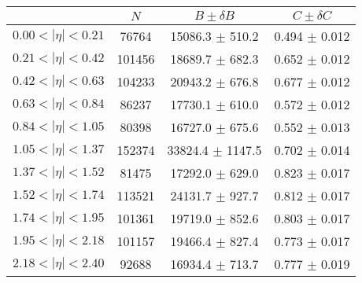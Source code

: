 \begin{tabular}{lccc}
\hline
    &   $N$   & $B \pm \delta B$  &  $C \pm \delta C$ \\
\hline
$0.00 < |\eta| <0.21$          & 76764      & 15086.3    $\pm$ 510.2 & 0.494      $\pm$ 0.012 \\
$0.21 < |\eta| <0.42$          & 101456     & 18689.7    $\pm$ 682.3 & 0.652      $\pm$ 0.012 \\
$0.42 < |\eta| <0.63$          & 104233     & 20943.2    $\pm$ 676.8 & 0.677      $\pm$ 0.012 \\
$0.63 < |\eta| <0.84$          & 86237      & 17730.1    $\pm$ 610.0 & 0.572      $\pm$ 0.012 \\
$0.84 < |\eta| <1.05$          & 80398      & 16727.0    $\pm$ 675.6 & 0.552      $\pm$ 0.013 \\
$1.05 < |\eta| <1.37$          & 152374     & 33824.4    $\pm$ 1147.5 & 0.702      $\pm$ 0.014 \\
$1.37 < |\eta| <1.52$          & 81475      & 17292.0    $\pm$ 629.0 & 0.823      $\pm$ 0.017 \\
$1.52 < |\eta| <1.74$          & 113521     & 24131.7    $\pm$ 927.7 & 0.812      $\pm$ 0.017 \\
$1.74 < |\eta| <1.95$          & 101361     & 19719.0    $\pm$ 852.6 & 0.803      $\pm$ 0.017 \\
$1.95 < |\eta| <2.18$          & 101157     & 19466.4    $\pm$ 827.4 & 0.773      $\pm$ 0.017 \\
$2.18 < |\eta| <2.40$          & 92688      & 16934.4    $\pm$ 713.7 & 0.777      $\pm$ 0.019 \\
\hline
\end{tabular}
